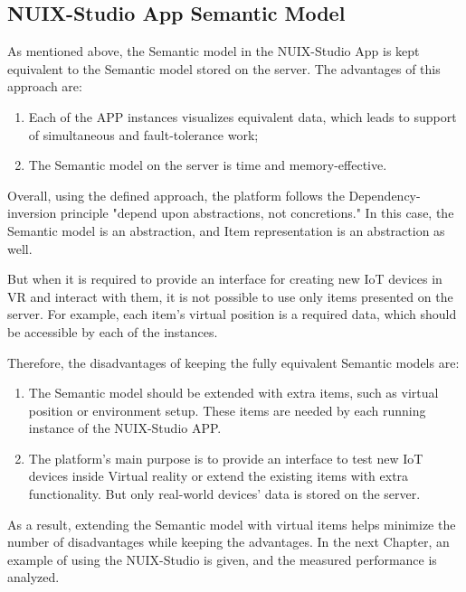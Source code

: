 \subsection{NUIX-Studio App Semantic Model}

As mentioned above, the Semantic model in the NUIX-Studio App is kept equivalent to the Semantic model stored on the server. The advantages of this approach are:

\begin{enumerate}
    \item Each of the APP instances visualizes equivalent data, which leads to support of simultaneous and fault-tolerance work;
    \item The Semantic model on the server is time and memory-effective.
\end{enumerate}

Overall, using the defined approach, the platform follows the Dependency-inversion principle "depend upon abstractions, not concretions." In this case, the Semantic model is an abstraction, and Item representation is an abstraction as well.

But when it is required to provide an interface for creating new IoT devices in VR and interact with them, it is not possible to use only items presented on the server. For example, each item's virtual position is a required data, which should be accessible by each of the instances.

Therefore, the disadvantages of keeping the fully equivalent Semantic models are:

\begin{enumerate}
    \item The Semantic model should be extended with extra items, such as virtual position or environment setup. These items are needed by each running instance of the NUIX-Studio APP.
    \item The platform's main purpose is to provide an interface to test new IoT devices inside Virtual reality or extend the existing items with extra functionality. But only real-world devices' data is stored on the server.
\end{enumerate}

As a result, extending the Semantic model with virtual items helps minimize the number of disadvantages while keeping the advantages.
In the next Chapter, an example of using the NUIX-Studio is given, and the measured performance is analyzed.